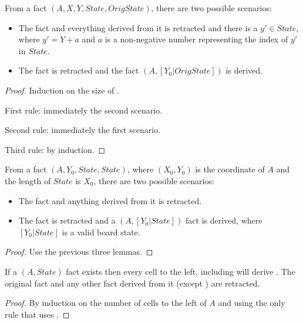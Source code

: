\begin{lemma}
From a fact $(A, X, Y, State, OrigState)$, there are
two possible scenarios:

\begin{itemize}

   \item The  fact and everything derived from it is
      retracted and there is a $y' \in State$, where $y' = Y + a$ and $a$ is a
      non-negative number representing the index of $y'$ in $State$.

   \item The  fact is retracted and the fact
      $(A, [Y_0 | OrigState])$ is derived.

\end{itemize}
\end{lemma}

\begin{proof}
Induction on the size of .

First rule: immediately the second scenario.

Second rule: immediately the first scenario.

Third rule: by induction.
\end{proof}

\begin{theorem}
From a fact $(A, Y_0, State, State)$, where $(X_0, Y_0)$ is the coordinate
of $A$ and the length of $State$ is $X_0$, there are two possible
scenarios:
   
   \begin{itemize}
      \item The  fact and anything derived from it is retracted.
      \item The  fact is retracted and a $(A,
         [Y_0 | State])$ fact is derived, where $[Y_0 | State]$ is
         a valid board state.
   \end{itemize}
\end{theorem}
\begin{proof}
Use the previous three lemmas.
\end{proof}

\begin{lemma}
If a $(A, State)$ fact exists then every cell to the left,
including  will derive . The original
 fact and any other fact derived from it (except
) are retracted.
\end{lemma}
\begin{proof}

By induction on the number of cells to the left of $A$ and using the only rule
that uses .

\end{proof}

